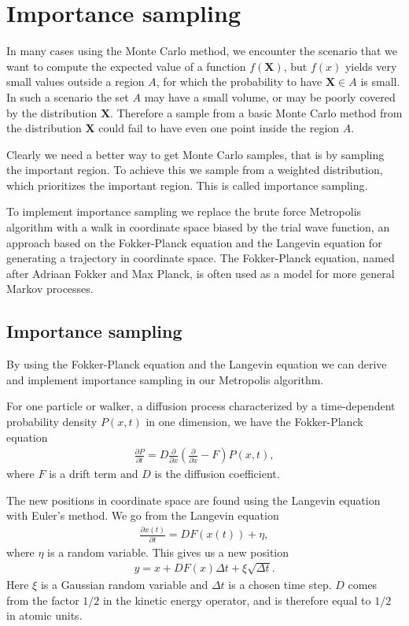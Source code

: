 \section{Importance sampling}
		\label{sec:importance_sampling}
		In many cases using the Monte Carlo method, we encounter the scenario that we want to compute the expected value of a function $f(\mathbf{X})$, but $f(x)$ yields very small values outside a region $A$, for which the probability to have $\mathbf{X}\in A$ is small. In such a scenario the set $A$ may have a small volume, or may be poorly covered by the distribution $\mathbf{X}$. Therefore a sample from a basic Monte Carlo method from the distribution $\mathbf{X}$ could fail to have even one point inside the region $A$. 

		Clearly we need a better way to get Monte Carlo samples, that is by sampling the important region. To achieve this we sample from a weighted distribution, which prioritizes the important region. This is called importance sampling.  
		
		To implement importance sampling we replace the brute force Metropolis algorithm with a walk in coordinate space biased by the trial wave function, an approach based on the Fokker-Planck equation \cite{fokker1914} \cite{planck1917} and the Langevin equation \cite{langevin1908} for generating a trajectory in coordinate space. The Fokker-Planck equation, named after Adriaan Fokker and Max Planck, is often used as a model for more general Markov processes. 

		\subsection{Importance sampling}

			By using the Fokker-Planck equation and the Langevin equation we can derive and implement importance sampling in our Metropolis algorithm.

			For one particle or walker, a diffusion process characterized by a
			time-dependent probability density $P\left(x,t\right)$ in one dimension,
			we have the Fokker-Planck equation
			\begin{align}
				\frac{\partial P}{\partial t}=D\frac{\partial}{\partial x}\left(\frac{\partial}{\partial x}-F\right)P\left(x,t\right),
			\end{align}
			where $F$ is a drift term and $D$ is the diffusion coefficient.

			The new positions in coordinate space are found using the Langevin
			equation with Euler's method. We go from the Langevin equation
			\begin{align}
				\frac{\partial x(t)}{\partial t}=DF(x(t))+\eta,
			\end{align}
			where $\eta$ is a random variable. This gives us a new position
			\begin{align}
				y=x+DF(x)\Delta t+\xi\sqrt{\Delta t}.
			\end{align}
			Here $\xi$ is a Gaussian random variable and $\Delta t$ is a chosen
			time step. $D$ comes from the factor $1/2$ in the kinetic energy
			operator, and is therefore equal to $1/2$ in atomic units.


